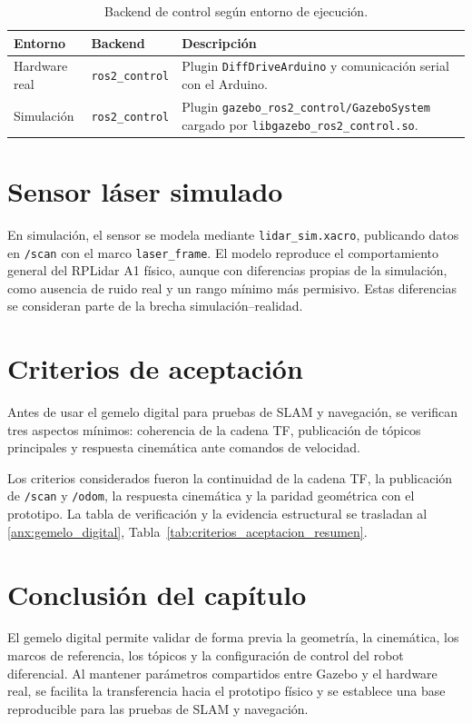 \begin{table}[H]
\centering
\caption{Backend de control según entorno de ejecución.}
\label{tab:xacro_args_backend}
\small
\begin{tabular}{p{2.5cm} p{2.5cm} p{8.5cm}}
\toprule
\textbf{Entorno} & \textbf{Backend} & \textbf{Descripción} \\
\midrule
Hardware real & \texttt{ros2\_control} & Plugin \texttt{DiffDriveArduino} y comunicación serial con el \gls{Arduino}. \\
Simulación & \texttt{ros2\_control} & Plugin \texttt{gazebo\_ros2\_control/GazeboSystem} cargado por \texttt{libgazebo\_ros2\_control.so}. \\
\bottomrule
\end{tabular}
\end{table}

\section{Sensor láser simulado}

En simulación, el sensor se modela mediante \texttt{lidar\_sim.xacro}, publicando datos en \texttt{/scan} con el marco \texttt{laser\_frame}. El modelo reproduce el comportamiento general del RPLidar A1 físico, aunque con diferencias propias de la simulación, como ausencia de ruido real y un rango mínimo más permisivo. Estas diferencias se consideran parte de la brecha simulación--realidad.

\section{Criterios de aceptación}

Antes de usar el gemelo digital para pruebas de SLAM y navegación, se verifican tres aspectos mínimos: coherencia de la cadena TF, publicación de tópicos principales y respuesta cinemática ante comandos de velocidad.

Los criterios considerados fueron la continuidad de la cadena TF, la
publicación de \texttt{/scan} y \texttt{/odom}, la respuesta cinemática y la
paridad geométrica con el prototipo. La tabla de verificación y la evidencia
estructural se trasladan al \ref{anx:gemelo_digital},
Tabla~\ref{tab:criterios_aceptacion_resumen}.

\section*{Conclusión del capítulo}

El gemelo digital permite validar de forma previa la geometría, la cinemática, los marcos de referencia, los tópicos y la configuración de control del robot diferencial. Al mantener parámetros compartidos entre Gazebo y el hardware real, se facilita la transferencia hacia el prototipo físico y se establece una base reproducible para las pruebas de SLAM y navegación.
